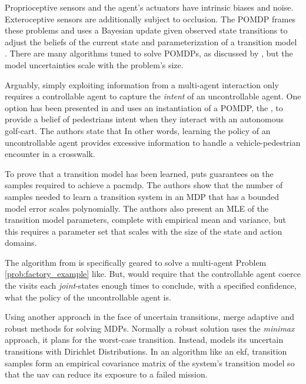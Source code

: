     Proprioceptive sensors and the agent's actuators have intrinsic biases and noise. Exteroceptive sensors are
    additionally subject to occlusion. The \ac{POMDP} frames these problems and uses a Bayesian update given observed
    state transitions to adjust the beliefs of the current state and parameterization of a transition model
    \cite{kaelbling1998planning}. There are many algorithms tuned to solve \acp{POMDP}, as discussed by
    \cite{bandyopadhyay2013intention}, but the model uncertainties scale with the problem's size.

    Arguably, simply exploiting information from a multi-agent interaction only requires a controllable agent to capture
    the \textit{intent} of an uncontrollable agent. One option has been presented in \cite{bandyopadhyay2013intention}
    and uses an instantiation of a \ac{POMDP}, the , to provide a belief of pedestrians intent when they
    interact with an autonomous golf-cart.  The authors state that  In other words, learning the policy of an
    uncontrollable agent provides excessive information to handle a vehicle-pedestrian encounter in a crosswalk.


    To prove that a transition model has been learned,  \cite{Fu-RSS-14} puts guarantees on the samples required to
    achieve a \ac{pacmdp}. The authors show that the number of samples needed to learn a transition system in an
    \ac{MDP} that has a bounded model error scales polynomially.  The authors also present an \ac{MLE} of the transition
    model parameters, complete with empirical mean and variance, but this requires a parameter set that scales with the
    size of the state and action domains.

    The \Rmax algorithm from \cite{brafman2002r} is specifically geared to solve a multi-agent Problem
    \ref{prob:factory_example} like. But, \Rmax would require that the controllable agent coerce the visits each
    \textit{joint}-states enough times to conclude, with a specified confidence, what the policy of the uncontrollable
    agent is.

    Using another approach in the face of uncertain transitions, \cite{bertuccelli2012robust} merge adaptive and robust
    methods for solving \acp{MDP}. Normally a robust solution uses the \textit{minimax} approach, it plans for the
    worst-case transition. Instead,  models its uncertain transitions with Dirichlet Distributions. In an
    algorithm like an \ac{ekf}, transition samples form an empirical covariance matrix of the system's transition model
    so that the \ac{uav} can reduce its exposure to a failed mission.


